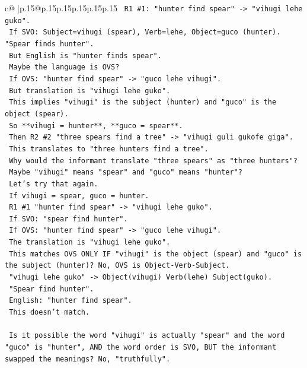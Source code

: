 \documentclass{article}
\begin{document}
{\begin{supertabular}{c@{$\;$}|p{.15\linewidth}@{}p{.15\linewidth}p{.15\linewidth}p{.15\linewidth}p{.15\linewidth}p{.15\linewidth}}
{{{\texttt{   R1 \#1: "hunter find spear" {-}> "vihugi lehe guko".} \\
\texttt{   If SVO: Subject=vihugi (spear), Verb=lehe, Object=guco (hunter). "Spear finds hunter".} \\
\texttt{   But English is "hunter finds spear".} \\
\texttt{   Maybe the language is OVS?} \\
\texttt{   If OVS: "hunter find spear" {-}> "guco lehe vihugi".} \\
\texttt{   But translation is "vihugi lehe guko".} \\
\texttt{   This implies "vihugi" is the subject (hunter) and "guco" is the object (spear).} \\
\texttt{   So **vihugi = hunter**, **guco = spear**.} \\
\texttt{   Then R2 \#2 "three spears find a tree" {-}> "vihugi guli gukofe giga".} \\
\texttt{   This translates to "three hunters find a tree".} \\
\texttt{   Why would the informant translate "three spears" as "three hunters"?} \\
\texttt{   Maybe "vihugi" means "spear" and "guco" means "hunter"?} \\
\texttt{   Let's try that again.} \\
\texttt{   If vihugi = spear, guco = hunter.} \\
\texttt{   R1 \#1 "hunter find spear" {-}> "vihugi lehe guko".} \\
\texttt{   If SVO: "spear find hunter".} \\
\texttt{   If OVS: "hunter find spear" {-}> "guco lehe vihugi".} \\
\texttt{   The translation is "vihugi lehe guko".} \\
\texttt{   This matches OVS ONLY IF "vihugi" is the object (spear) and "guco" is the subject (hunter)? No, OVS is Object{-}Verb{-}Subject.} \\
\texttt{   "vihugi lehe guko" {-}> Object(vihugi) Verb(lehe) Subject(guko).} \\
\texttt{   "Spear find hunter".} \\
\texttt{   English: "hunter find spear".} \\
\texttt{   This doesn't match.} \\
\\ 
\texttt{   Is it possible the word "vihugi" is actually "spear" and the word "guco" is "hunter", AND the word order is SVO, BUT the informant swapped the meanings? No, "truthfully".} \\
}}}
\end{supertabular}}
\end{document}
